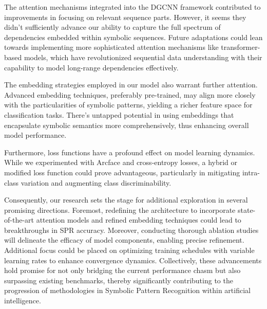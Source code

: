 \documentclass{article}
\begin{document}
The attention mechanisms integrated into the DGCNN framework contributed to improvements in focusing on relevant sequence parts. However, it seems they didn't sufficiently advance our ability to capture the full spectrum of dependencies embedded within symbolic sequences. Future adaptations could lean towards implementing more sophisticated attention mechanisms like transformer-based models, which have revolutionized sequential data understanding with their capability to model long-range dependencies effectively.

The embedding strategies employed in our model also warrant further attention. Advanced embedding techniques, preferably pre-trained, may align more closely with the particularities of symbolic patterns, yielding a richer feature space for classification tasks. There's untapped potential in using embeddings that encapsulate symbolic semantics more comprehensively, thus enhancing overall model performance.

Furthermore, loss functions have a profound effect on model learning dynamics. While we experimented with Arcface and cross-entropy losses, a hybrid or modified loss function could prove advantageous, particularly in mitigating intra-class variation and augmenting class discriminability.

Consequently, our research sets the stage for additional exploration in several promising directions. Foremost, redefining the architecture to incorporate state-of-the-art attention models and refined embedding techniques could lead to breakthroughs in SPR accuracy. Moreover, conducting thorough ablation studies will delineate the efficacy of model components, enabling precise refinement. Additional focus could be placed on optimizing training schedules with variable learning rates to enhance convergence dynamics. Collectively, these advancements hold promise for not only bridging the current performance chasm but also surpassing existing benchmarks, thereby significantly contributing to the progression of methodologies in Symbolic Pattern Recognition within artificial intelligence.
\end{document}
